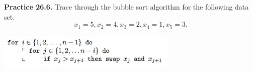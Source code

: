 \documentclass[aspectratio=169]{beamer}
\begin{document}
\begin{frame}[plain]{}

  {\bf Practice 26.6.}   Trace through the bubble sort algorithm for the following data set.
     \[ x_1 = 5, x_2=4, x_3=2, x_4=1, x_5=3. \]
     
     \begin{center}
			\includegraphics[height=1.7cm]{./img/lecture26-fig6.png}
		\end{center}
  \vspace{1in}
  
\end{frame}
\end{document}
